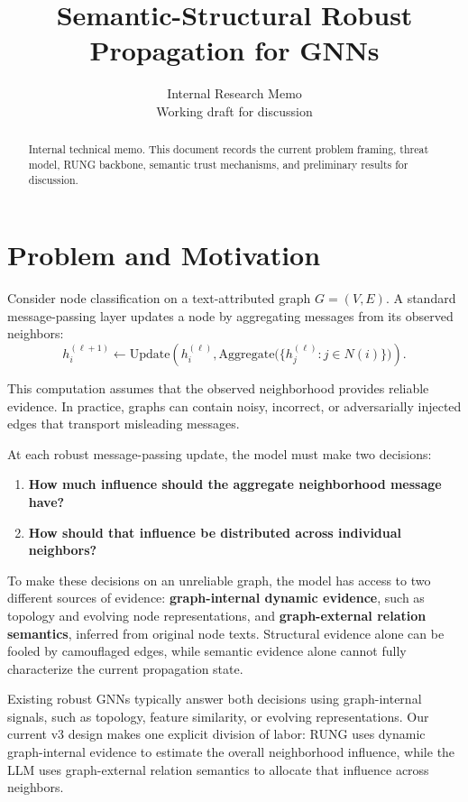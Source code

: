 \documentclass{article}
\title{Semantic-Structural Robust Propagation for GNNs}
\author{Internal Research Memo \\
Working draft for discussion}
\begin{document}
\onecolumn
\maketitle

\begin{abstract}
Internal technical memo. This document records the current problem framing,
threat model, RUNG backbone, semantic trust mechanisms, and preliminary
results for discussion.
\end{abstract}

\section{Problem and Motivation}

Consider node classification on a text-attributed graph $G=(V,E)$. A standard
message-passing layer updates a node by aggregating messages from its observed
neighbors:
\[
  h_i^{(\ell+1)} \leftarrow
  \mathrm{Update}\!\left(h_i^{(\ell)},
  \mathrm{Aggregate}\bigl(\{h_j^{(\ell)}:j\in N(i)\}\bigr)\right).
\]

This computation assumes that the observed neighborhood provides reliable
evidence. In practice, graphs can contain noisy, incorrect, or adversarially
injected edges that transport misleading messages.

At each robust message-passing update, the model must make two decisions:
\begin{enumerate}
  \item \textbf{How much influence should the aggregate neighborhood message
  have?}
  \item \textbf{How should that influence be distributed across individual
  neighbors?}
\end{enumerate}

To make these decisions on an unreliable graph, the model has access to two
different sources of evidence: \textbf{graph-internal dynamic evidence}, such
as topology and evolving node representations, and \textbf{graph-external
relation semantics}, inferred from original node texts. Structural evidence
alone can be fooled by camouflaged edges, while semantic evidence alone cannot
fully characterize the current propagation state.

Existing robust GNNs typically answer both decisions using graph-internal
signals, such as topology, feature similarity, or evolving representations.
Our current v3 design makes one explicit division of labor: RUNG uses dynamic
graph-internal evidence to estimate the overall neighborhood influence, while
the LLM uses graph-external relation semantics to allocate that influence
across neighbors.
\end{document}
